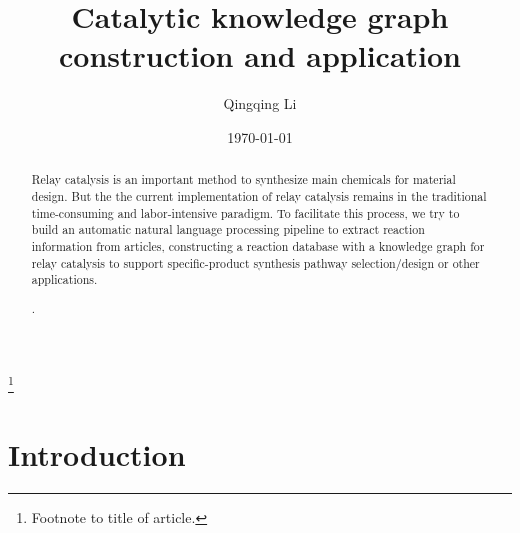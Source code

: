 \documentclass[%
 aip,
 jmp,%
 amsmath,amssymb,
 reprint,%
]{revtex4-2}
\begin{document}

\title[Catalytic knowledge graph construction and application]{Catalytic knowledge graph construction and application}%
\thanks{Footnote to title of article.}

\author{Qingqing Li}

\date{\today}%

\begin{abstract}
Relay catalysis is an important method to synthesize main chemicals for material design. But the 
the current implementation of relay catalysis remains in the traditional time-consuming 
and labor-intensive paradigm. To facilitate this process, we try to build an automatic natural language 
processing pipeline to extract reaction information from articles, constructing a reaction 
database with a knowledge graph for relay catalysis to support specific-product synthesis pathway selection/design or other applications.

.
%
\end{abstract}

\maketitle



\section{Introduction}
\end{document}
